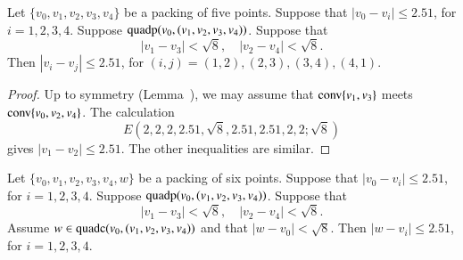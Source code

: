 \begin{tarskidata}
\begin{tarski}

\begin{lemma}  
Let $\{v_0,v_1,v_2,v_3,v_4\}$ be a packing of five points.
Suppose that $|v_0-v_i|\le 2.51$, for $i=1,2,3,4$.
Suppose ${\operatorname{quadp}}(v_0,(v_1,v_2,v_3,v_4))$.
Suppose that
  $$|v_1-v_3|<\sqrt8,\quad |v_2-v_4| <\sqrt8.$$
Then $|v_i-v_j|\le 2.51$, for $(i,j)=(1,2),(2,3),(3,4),(4,1)$.
\end{lemma}


\begin{proof}
Up to symmetry (Lemma~), we may assume
that ${\operatorname{conv}}\{v_1,v_3\}$ meets ${\operatorname{conv}}\{v_0,v_2,v_4\}$.
The calculation
   $$
   E(2,2,2,2.51,\sqrt8,2.51,2.51,2,2; \sqrt8)
   $$
gives $|v_1-v_2|\le 2.51$. The other inequalities are similar.
\end{proof}
\end{tarski}





\begin{tarski}

\begin{lemma} 
Let $\{v_0,v_1,v_2,v_3,v_4,w\}$ be a packing of six points.
Suppose that $|v_0-v_i|\le 2.51$, for $i=1,2,3,4$.
Suppose ${\operatorname{quadp}}(v_0,(v_1,v_2,v_3,v_4))$.
Suppose that
  $$|v_1-v_3|<\sqrt8,\quad |v_2-v_4| <\sqrt8.$$
Assume $w\in{\operatorname{quadc}}(v_0,(v_1,v_2,v_3,v_4))$ and that $|w-v_0|<\sqrt8$.
Then $|w-v_i|\le 2.51$, for $i=1,2,3,4$.
\end{lemma}



\end{tarski}
\end{tarskidata}
